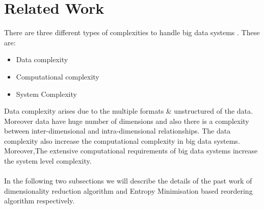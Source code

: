 \chapter{Related Work}
\label{cha:relwork}

There are three different types of complexities to handle big data systems \cite{p307}. These are:
\begin{itemize}
	\item Data complexity
	\item Computational complexity
	\item System Complexity
\end{itemize}
Data complexity arises due to the multiple formats \& unstructured of the data. Moreover data have huge number of dimensions and also there is a complexity between inter-dimensional and intra-dimensional relationships. The data complexity also increase the computational complexity in big data systems. Moreover,The extensive computational requirements of big data systems increase the system level complexity.\\\\
In the following two subsections we will describe the details of the past work of dimensionality reduction algorithm and Entropy Minimisation based reordering algorithm respectively.
